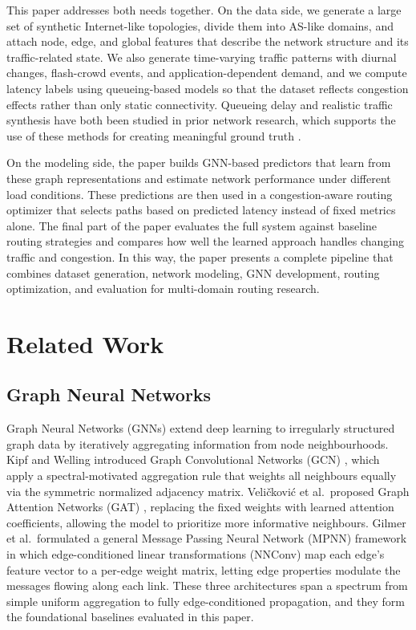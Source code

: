 \documentclass[12pt]{article}
\begin{document}
This paper addresses both needs together. On the data side, we generate a large set of synthetic Internet-like topologies, divide them into AS-like domains, and attach node, edge, and global features that describe the network structure and its traffic-related state. We also generate time-varying traffic patterns with diurnal changes, flash-crowd events, and application-dependent demand, and we compute latency labels using queueing-based models so that the dataset reflects congestion effects rather than only static connectivity. Queueing delay and realistic traffic synthesis have both been studied in prior network research, which supports the use of these methods for creating meaningful ground truth \cite{internetTrafficMatrices}.

On the modeling side, the paper builds GNN-based predictors that learn from these graph representations and estimate network performance under different load conditions. These predictions are then used in a congestion-aware routing optimizer that selects paths based on predicted latency instead of fixed metrics alone. The final part of the paper evaluates the full system against baseline routing strategies and compares how well the learned approach handles changing traffic and congestion. In this way, the paper presents a complete pipeline that combines dataset generation, network modeling, GNN development, routing optimization, and evaluation for multi-domain routing research.

\section{Related Work}
\label{sec:related_work}

\subsection{Graph Neural Networks}
Graph Neural Networks (GNNs) extend deep learning to irregularly structured graph data by iteratively aggregating information from node neighbourhoods. Kipf and Welling introduced Graph Convolutional Networks (GCN) \cite{gcnKipf}, which apply a spectral-motivated aggregation rule that weights all neighbours equally via the symmetric normalized adjacency matrix. Veličković et al.\ proposed Graph Attention Networks (GAT) \cite{gatVelickovic}, replacing the fixed weights with learned attention coefficients, allowing the model to prioritize more informative neighbours. Gilmer et al.\ formulated a general Message Passing Neural Network (MPNN) framework \cite{mpnnGilmer} in which edge-conditioned linear transformations (NNConv) map each edge's feature vector to a per-edge weight matrix, letting edge properties modulate the messages flowing along each link. These three architectures span a spectrum from simple uniform aggregation to fully edge-conditioned propagation, and they form the foundational baselines evaluated in this paper.
\end{document}
